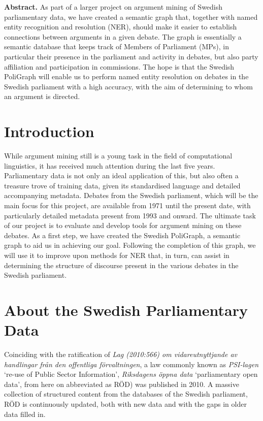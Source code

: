 \UseRawInputEncoding

\textbf{Abstract.} As part of a larger project on argument mining of Swedish parliamentary data, we have created a semantic graph that, together with named entity recognition and resolution (NER), should make it easier to establish connections between arguments in a given debate. The graph is essentially a semantic database that keeps track of Members of Parliament (MPs), in particular their presence in the parliament and activity in debates, but also party affiliation and participation in commissions. The hope is that the Swedish PoliGraph will enable us to perform named entity resolution on debates in the Swedish parliament with a high accuracy, with the aim of determining to whom an argument is directed.

\section{Introduction}

While argument mining still is a young task in the field of computational linguistics, it has received much attention during the last five years. Parliamentary data is not only an ideal application of this, but also often a treasure trove of training data, given its standardised language and detailed accompanying metadata. Debates from the Swedish parliament, which will be the main focus for this project, are available from 1971 until the present date, with particularly detailed metadata present from 1993 and onward. The ultimate task of our project is to evaluate and develop tools for argument mining on these debates. As a first step, we have created the Swedish PoliGraph, a semantic graph to aid us in achieving our goal. Following the completion of this graph, we will use it to improve upon methods for NER that, in turn, can assist in determining the structure of discourse present in the various debates in the Swedish parliament.

\section{About the Swedish Parliamentary Data}

Coinciding with the ratification of \emph{Lag (2010:566) om vidareutnyttjande av handlingar från den offentliga förvaltningen}, a law commonly known as \emph{PSI-lagen} `re-use of Public Sector Information', \emph{Riksdagens öppna data} `parliamentary open data', from here on abbreviated as RÖD) was published in 2010. A massive collection of structured content from the databases of the Swedish parliament, RÖD is continuously updated, both with new data and with the gaps in older data filled in.

